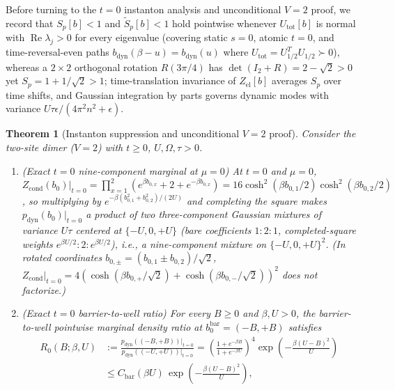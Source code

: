 \documentclass[11pt]{article}
\newtheorem{theorem}{Theorem}[section]
\theoremstyle{definition}
\theoremstyle{remark}
\begin{document}
Before turning to the $t=0$ instanton analysis and unconditional $V=2$ proof,
we record that $S_p[b] < 1$ and $\tilde{S}_p[b] < 1$ hold pointwise whenever
$U_{\mathrm{tot}}[b]$ is normal with $\operatorname{Re}\lambda_j > 0$ for every
eigenvalue (covering static $s=0$, atomic $t=0$, and time-reversal-even paths
$b_{\mathrm{dyn}}(\beta - u) = b_{\mathrm{dyn}}(u)$ where $U_{\mathrm{tot}} = U_{1/2}^T U_{1/2} \succ 0$),
whereas a $2\times 2$ orthogonal rotation $R(3\pi/4)$ has $\det(I_2 + R) = 2-\sqrt{2} > 0$
yet $S_p = 1 + 1/\sqrt{2} > 1$; time-translation invariance of $Z_{\mathrm{el}}[b]$
averages $S_p$ over time shifts, and Gaussian integration by parts governs
dynamic modes with variance $U\tau\epsilon/(4\pi^2 n^2 + \epsilon)$.

\begin{theorem}[Instanton suppression and unconditional $V=2$ proof]
\label{thm:ae-v2}
Consider the two-site dimer ($V=2$) with $t \ge 0$, $U, \Omega, \tau > 0$.
\begin{enumerate}[leftmargin=1.5em]
\item \emph{(Exact $t=0$ nine-component marginal at $\mu=0$)} At $t=0$ and $\mu=0$,
$Z_{\mathrm{cond}}(b_0)|_{t=0} = \prod_{x=1}^2 (e^{\beta b_{0,x}} + 2 + e^{-\beta b_{0,x}}) = 16\cosh^2(\beta b_{0,1}/2)\cosh^2(\beta b_{0,2}/2)$,
so multiplying by $e^{-\beta(b_{0,1}^2+b_{0,2}^2)/(2U)}$ and completing the square
makes $p_{\mathrm{dyn}}(b_0)|_{t=0}$ a product of two three-component Gaussian
mixtures of variance $U\tau$ centered at $\{-U, 0, +U\}$ (bare coefficients $1:2:1$,
completed-square weights $e^{\beta U/2}:2:e^{\beta U/2}$), i.e., a nine-component
mixture on $\{-U, 0, +U\}^2$. (In rotated coordinates $b_{0,\pm} = (b_{0,1}\pm b_{0,2})/\sqrt{2}$,
$Z_{\mathrm{cond}}|_{t=0} = 4(\cosh(\beta b_{0,+}/\sqrt{2}) + \cosh(\beta b_{0,-}/\sqrt{2}))^2$
does not factorize.)
\item \emph{(Exact $t=0$ barrier-to-well ratio)} For every $B \ge 0$ and $\beta, U > 0$,
the barrier-to-well pointwise marginal density ratio at $b_0^{\mathrm{bar}} = (-B, +B)$ satisfies
\begin{equation}
\label{eq:ae-r0}
\begin{aligned}
R_0(B; \beta, U)
&:= \frac{p_{\mathrm{dyn}}((-B,+B))|_{t=0}}{p_{\mathrm{dyn}}((-U,+U))|_{t=0}}
= \left(\frac{1 + e^{-\beta B}}{1 + e^{-\beta U}}\right)^4 \exp\!\left(-\frac{\beta(U-B)^2}{U}\right) \\
&\le C_{\mathrm{bar}}(\beta U)\,\exp\!\left(-\frac{\beta(U-B)^2}{U}\right),
\end{aligned}

\end{equation}
\end{enumerate}
\end{theorem}
\end{document}
